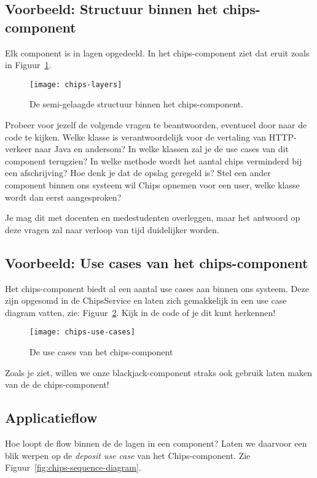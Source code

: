 \documentclass[dutch,a4paper,12pt,doubleside]{book}
\begin{document}
\subsection{Voorbeeld: Structuur binnen het chips-component}
Elk component is in lagen opgedeeld. In het chips-component ziet 
dat eruit zoals in Figuur~\ref{fig:chips-layers}.

\begin{figure}[H]
    \centering
    \texttt{[image: chips-layers]}
    \caption{De semi-gelaagde structuur binnen het chips-component.}
    \label{fig:chips-layers}
\end{figure}

Probeer voor jezelf de volgende vragen te beantwoorden, eventueel door naar de code te kijken.
Welke klasse is verantwoordelijk voor de vertaling van HTTP-verkeer naar Java en andersom?
In welke klassen zal je de use cases van dit component terugzien?
In welke methode wordt het aantal chips verminderd bij een afschrijving?
Hoe denk je dat de opslag geregeld is?
Stel een ander component binnen ons systeem wil Chips opnemen voor een user, welke klasse wordt dan 
eerst aangesproken?

Je mag dit met docenten en medestudenten overleggen, 
maar het antwoord op deze vragen zal naar verloop van tijd duidelijker worden.

\newpage
\subsection{Voorbeeld: Use cases van het chips-component}
Het chips-component biedt al een aantal use cases aan binnen ons systeem.
Deze zijn opgesomd in de ChipsService en laten zich gemakkelijk in een 
use case diagram vatten, zie: Figuur~\ref{fig:chips-use-cases}.
Kijk in de code of je dit kunt herkennen!

\begin{figure}[H]
    \centering
    \texttt{[image: chips-use-cases]}
    \caption{De use cases van het chips-component}
    \label{fig:chips-use-cases}
\end{figure}

Zoals je ziet, willen we onze blackjack-component straks 
ook gebruik laten maken van de de chips-component!

\newpage
\subsection{Applicatieflow}
Hoe loopt de flow binnen de de lagen in een component? 
Laten we daarvoor een blik werpen 
op de \emph{deposit use case} van het Chips-component.
Zie Figuur~\ref{fig:chips-sequence-diagram}.
\end{document}
